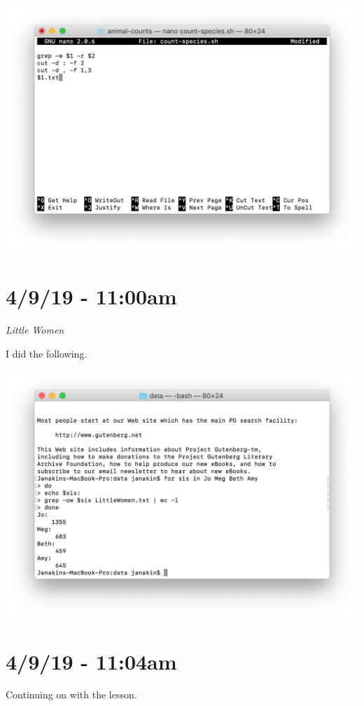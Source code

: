 \documentclass{article}
\begin{document}
\includegraphics[width=\textwidth]{ftb.png}

\section*{4/9/19 - 11:00am}

\textit{Little Women}

I did the following.

\includegraphics[width=\textwidth]{ftc.png}

\section*{4/9/19 - 11:04am}

Continuing on with the lesson.
\end{document}
